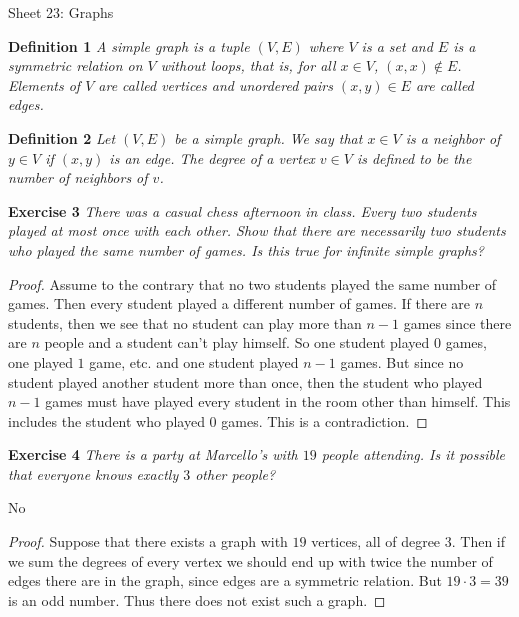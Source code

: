 \documentclass{article}
\begin{document}
\begin{flushleft}

\Large

Sheet 23: Graphs\newline

\normalsize



\textbf{Definition 1}
\textsl{A simple graph is a tuple $(V,E)$ where $V$ is a set and $E$ is a symmetric relation on $V$ without loops, that is, for all $x \in V$, $(x,x) \notin E$. Elements of $V$ are called vertices and unordered pairs $(x,y) \in E$ are called edges.}\newline

\textbf{Definition 2}
\textsl{Let $(V,E)$ be a simple graph. We say that $x \in V$ is a neighbor of $y \in V$ if $(x,y)$ is an edge. The degree of a vertex $v \in V$ is defined to be the number of neighbors of $v$.}\newline

\textbf{Exercise 3}
\textsl{There was a casual chess afternoon in class. Every two students played at most once with each other. Show that there are necessarily two students who played the same number of games. Is this true for infinite simple graphs?}
\begin{proof}
Assume to the contrary that no two students played the same number of games. Then every student played a different number of games. If there are $n$ students, then we see that no student can play more than $n-1$ games since there are $n$ people and a student can't play himself. So one student played $0$ games, one played $1$ game, etc. and one student played $n-1$ games. But since no student played another student more than once, then the student who played $n-1$ games must have played every student in the room other than himself. This includes the student who played $0$ games. This is a contradiction.
\end{proof}

\textbf{Exercise 4}
\textsl{There is a party at Marcello's with $19$ people attending. Is it possible that everyone knows exactly $3$ other people?}\newline

No
\begin{proof}
Suppose that there exists a graph with $19$ vertices, all of degree $3$. Then if we sum the degrees of every vertex we should end up with twice the number of edges there are in the graph, since edges are a symmetric relation. But $19\cdot 3 = 39$ is an odd number. Thus there does not exist such a graph.
\end{proof}


\end{flushleft}
\end{document}
